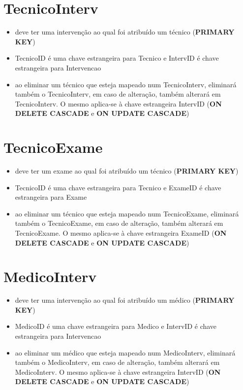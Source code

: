 \documentclass[article, a4paper, 12pt, oneside]{memoir}
\begin{document}
\section*{TecnicoInterv}
\begin{itemize}
	\item deve ter uma intervenção ao qual foi atribuído um técnico (\textbf{PRIMARY KEY})
	\item TecnicoID é uma chave estrangeira para Tecnico e IntervID é chave estrangeira para Intervencao
	\item ao eliminar um técnico que esteja mapeado num TecnicoInterv, eliminará também o TecnicoInterv, em caso de alteração, também alterará em TecnicoInterv. O mesmo aplica-se à chave estrangeira IntervID (\textbf{ON DELETE CASCADE} e \textbf{ON UPDATE CASCADE})
\end{itemize}

\section*{TecnicoExame}
\begin{itemize}
	\item deve ter um exame ao qual foi atribuído um técnico (\textbf{PRIMARY KEY})
	\item TecnicoID é uma chave estrangeira para Tecnico e ExameID é chave estrangeira para Exame
	\item ao eliminar um técnico que esteja mapeado num TecnicoExame, eliminará também o TecnicoExame, em caso de alteração, também alterará em TecnicoExame. O mesmo aplica-se à chave estrangeira ExameID (\textbf{ON DELETE CASCADE} e \textbf{ON UPDATE CASCADE})
\end{itemize}

\section*{MedicoInterv}
\begin{itemize}
	\item deve ter uma intervenção ao qual foi atribuído um médico (\textbf{PRIMARY KEY})
	\item MedicoID é uma chave estrangeira para Medico e IntervID é chave estrangeira para Intervencao
	\item ao eliminar um médico que esteja mapeado num MedicoInterv, eliminará também o MedicoInterv, em caso de alteração, também alterará em MedicoInterv. O mesmo aplica-se à chave estrangeira IntervID (\textbf{ON DELETE CASCADE} e \textbf{ON UPDATE CASCADE})
\end{itemize}
\end{document}
